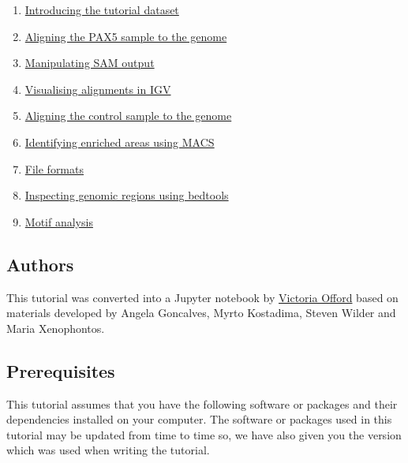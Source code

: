 \documentclass[11pt]{article}
\providecommand{\tightlist}{%
      \setlength{\itemsep}{0pt}\setlength{\parskip}{0pt}}
\begin{document}
\begin{enumerate}
\def\labelenumi{\arabic{enumi}.}
\tightlist
\item
  \href{dataset-intro.ipynb}{Introducing the tutorial dataset}
\item
  \href{pax5-alignment.ipynb}{Aligning the PAX5 sample to the genome}
\item
  \href{manipulate-sam.ipynb}{Manipulating SAM output}
\item
  \href{alignment-visualisation.ipynb}{Visualising alignments in IGV}
\item
  \href{control-alignment.ipynb}{Aligning the control sample to the
  genome}
\item
  \href{identifying-enriched-areas.ipynb}{Identifying enriched areas
  using MACS}
\item
  \href{file-formats.ipynb}{File formats}
\item
  \href{inspecting-genomic-regions.ipynb}{Inspecting genomic regions
  using bedtools}
\item
  \href{motif-analysis.ipynb}{Motif analysis}
\end{enumerate}

\hypertarget{authors}{%
\subsection{Authors}\label{authors}}

This tutorial was converted into a Jupyter notebook by
\href{https://github.com/vaofford}{Victoria Offord} based on materials
developed by Angela Goncalves, Myrto Kostadima, Steven Wilder and Maria
Xenophontos.

\newpage

    \hypertarget{prerequisites}{%
\subsection{Prerequisites}\label{prerequisites}}

This tutorial assumes that you have the following software or packages
and their dependencies installed on your computer. The software or
packages used in this tutorial may be updated from time to time so, we
have also given you the version which was used when writing the
tutorial.
\end{document}
